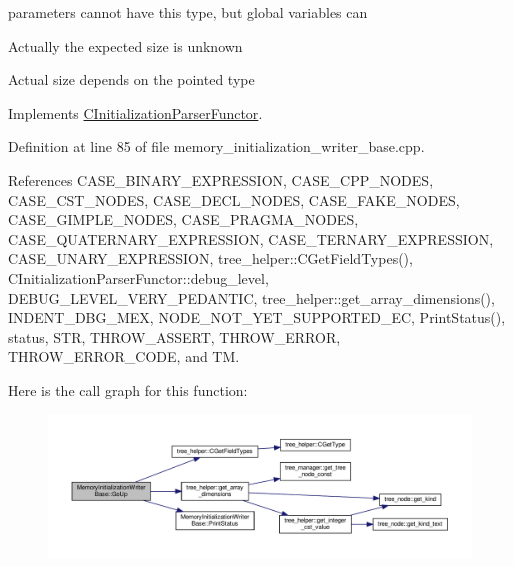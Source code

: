 parameters cannot have this type, but global variables can

Actually the expected size is unknown

Actual size depends on the pointed type 

Implements \hyperlink{classCInitializationParserFunctor_ac502a0c076635becd22e65f2281c5c46}{C\+Initialization\+Parser\+Functor}.



Definition at line 85 of file memory\+\_\+initialization\+\_\+writer\+\_\+base.\+cpp.



References C\+A\+S\+E\+\_\+\+B\+I\+N\+A\+R\+Y\+\_\+\+E\+X\+P\+R\+E\+S\+S\+I\+ON, C\+A\+S\+E\+\_\+\+C\+P\+P\+\_\+\+N\+O\+D\+ES, C\+A\+S\+E\+\_\+\+C\+S\+T\+\_\+\+N\+O\+D\+ES, C\+A\+S\+E\+\_\+\+D\+E\+C\+L\+\_\+\+N\+O\+D\+ES, C\+A\+S\+E\+\_\+\+F\+A\+K\+E\+\_\+\+N\+O\+D\+ES, C\+A\+S\+E\+\_\+\+G\+I\+M\+P\+L\+E\+\_\+\+N\+O\+D\+ES, C\+A\+S\+E\+\_\+\+P\+R\+A\+G\+M\+A\+\_\+\+N\+O\+D\+ES, C\+A\+S\+E\+\_\+\+Q\+U\+A\+T\+E\+R\+N\+A\+R\+Y\+\_\+\+E\+X\+P\+R\+E\+S\+S\+I\+ON, C\+A\+S\+E\+\_\+\+T\+E\+R\+N\+A\+R\+Y\+\_\+\+E\+X\+P\+R\+E\+S\+S\+I\+ON, C\+A\+S\+E\+\_\+\+U\+N\+A\+R\+Y\+\_\+\+E\+X\+P\+R\+E\+S\+S\+I\+ON, tree\+\_\+helper\+::\+C\+Get\+Field\+Types(), C\+Initialization\+Parser\+Functor\+::debug\+\_\+level, D\+E\+B\+U\+G\+\_\+\+L\+E\+V\+E\+L\+\_\+\+V\+E\+R\+Y\+\_\+\+P\+E\+D\+A\+N\+T\+IC, tree\+\_\+helper\+::get\+\_\+array\+\_\+dimensions(), I\+N\+D\+E\+N\+T\+\_\+\+D\+B\+G\+\_\+\+M\+EX, N\+O\+D\+E\+\_\+\+N\+O\+T\+\_\+\+Y\+E\+T\+\_\+\+S\+U\+P\+P\+O\+R\+T\+E\+D\+\_\+\+EC, Print\+Status(), status, S\+TR, T\+H\+R\+O\+W\+\_\+\+A\+S\+S\+E\+RT, T\+H\+R\+O\+W\+\_\+\+E\+R\+R\+OR, T\+H\+R\+O\+W\+\_\+\+E\+R\+R\+O\+R\+\_\+\+C\+O\+DE, and TM.

Here is the call graph for this function\+:
\nopagebreak
\begin{figure}[H]
\begin{center}
\leavevmode
\includegraphics[width=350pt]{d3/d26/classMemoryInitializationWriterBase_a0ff1c989969769e131c36172cc3f8ce3_cgraph}
\end{center}
\end{figure}
\mbox{\label{classMemoryInitializationWriterBase_aff08e4a2fa61dbb92047774c680db0b7}} 
